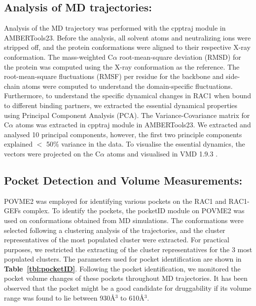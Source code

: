 \documentclass[12pt, a4paper]{achemso}
\begin{document}
\subsection{Analysis of MD trajectories:} 
    Analysis of the MD trajectory was performed with the cpptraj\cite{cpptraj} module in AMBERTools23.  Before the analysis, all solvent atoms and neutralizing ions were stripped off, and the protein conformations were aligned to their respective X-ray conformation.  The mass-weighted C$\alpha$ root-mean-square deviation (RMSD) for the protein was computed using the X-ray conformation as the reference. The root-mean-square fluctuations (RMSF) per residue for the backbone and side-chain atoms were computed to understand the domain-specific fluctuations. 
    Furthermore, to understand the specific dynamical changes in RAC1 when bound to different binding partners, we extracted the essential dynamical properties using Principal Component Analysis (PCA). The Variance-Covariance matrix for C$\alpha$ atoms was extracted in  cpptraj\cite{cpptraj} module in AMBERTools23. We extracted and analysed 10 principal components, however, the first two principle components explained $<$ 50\% variance in the data. To visualise the essential dynamics, the vectors were projected on the C$\alpha$ atoms and visualised in VMD 1.9.3 \cite{humphrey1996vmd}.

\subsection{Pocket Detection and Volume Measurements:} 
    POVME2 \cite{durrant2011povme, durrant2014povme} was employed for identifying various pockets on the RAC1 and RAC1-GEFs complex. To identify the pockets, the pocketID module on POVME2 was used on conformations obtained from MD simulations. The conformations were selected following a clustering analysis of the trajectories, and the cluster representatives of the most populated cluster were extracted. For practical purposes, we restricted the extracting of the cluster representatives for the 3 most populated clusters. The parameters used for pocket identification are shown in \textbf{Table~\ref{tbl:pocketID}}. Following the pocket identification, we monitored the pocket volume changes of these pockets throughout MD trajectories. It has been observed that the pocket might be a good candidate for druggability if its volume range\cite{perot2010druggable, nayal2006nature, an2005pocketome} was found to lie between 930\r{A}$^3$ to 610\r{A}$^3$. 
    
\end{document}
